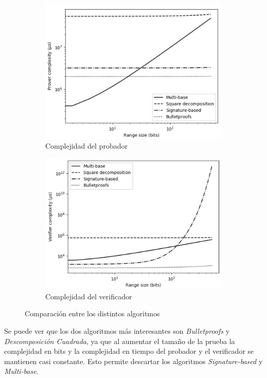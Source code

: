 \begin{figure}[H]
    \begin{subfigure}[c]{0.45\textwidth}
        \includegraphics[width=\textwidth]{images/proverComplexity.png}
        \caption{Complejidad del probador}
    \end{subfigure}
    \begin{subfigure}[c]{0.45\textwidth}
        \includegraphics[width=\textwidth]{images/verifierComplexity.png}
        \caption{Complejidad del verificador}
    \end{subfigure}
    \caption{Comparación entre los distintos algoritmos \cite{Survey}}
    \label{im:comparacion}
\end{figure}

Se puede ver que los dos algoritmos más interesantes son \emph{Bulletproofs} y \emph{Descomposición Cuadrada}, ya que al aumentar el tamaño de la prueba la complejidad en bits y la complejidad en tiempo del probador y el verificador se mantienen casi constante. Esto permite descartar los algoritmos \emph{Signature-based} y \emph{Multi-base}.

